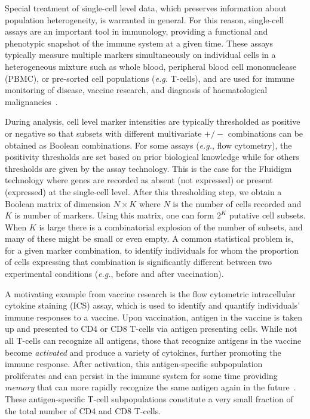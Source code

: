 \documentclass[useAMS,referee,usenatbib]{biom}
\begin{document}
Special treatment of single-cell level data, which preserves information about population heterogeneity, is warranted in general. 
For this reason, single-cell assays are an important tool in immunology, providing a functional and phenotypic snapshot of the immune system at a given time. 
These assays typically measure multiple markers simultaneously on individual cells in a heterogeneous mixture such as whole blood, peripheral blood cell mononuclease (PBMC), or pre-sorted cell populations (\textit{e.g.} T-cells), and are used for immune monitoring of disease, vaccine research, and diagnosis of haematological malignancies~\citep{Altman:1996wf,Betts:2006dw,Inokuma:2007tn}.

During analysis, cell level marker intensities are typically thresholded as positive or negative so that subsets with different multivariate $+/-$ combinations can be obtained as Boolean combinations. 
For some assays (\textit{e.g.}, flow cytometry), the positivity thresholds are set based on prior biological knowledge while for others thresholds are given by the assay technology. 
This is the case for the Fluidigm technology where genes are recorded as absent (not expressed) or present (expressed) at the single-cell level.
 After this thresholding step, we obtain a Boolean matrix of dimension $N\times K$ where $N$ is the number of cells recorded and $K$ is number of markers. 
Using this matrix, one can form $2^K$ putative cell subsets. 
When $K$ is large there is a combinatorial explosion of the number of subsets, and many of these might be small or even empty. 
A common statistical problem is, for a given marker combination, to identify individuals for whom the proportion of cells expressing that combination is significantly different between two experimental conditions (\textit{e.g.}, before and after vaccination). 

A motivating example from vaccine research is the flow cytometric intracellular cytokine staining (ICS) assay, which is used to identify and quantify individuals' immune responses to a vaccine. Upon vaccination, antigen in the vaccine is taken up and presented to CD4 or CD8 T-cells via antigen presenting cells.
 While not all T-cells can recognize all antigens, those that recognize antigens in the vaccine become \emph{activated} and produce a variety of cytokines, further promoting the immune response. 
 After activation, this antigen-specific subpopulation proliferates and can persist in the immune system for some time providing \emph{memory} that can more rapidly recognize the same antigen again in the future~\citep{McKinstry:2010ei}. 
 These antigen-specific T-cell subpopulations constitute a very small fraction of the total number of CD4 and CD8 T-cells. 
\end{document}
